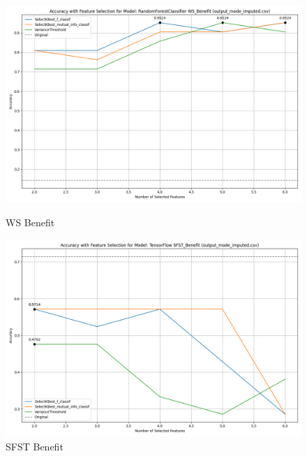 \begin{figure}[H]
    \centering
    \begin{minipage}[b]{0.45\textwidth}
        \includegraphics[width=\textwidth]{class_specific_section/images_class_ensemble_reduction/feature_selection_accuracy_plot_output_mode_imputedcsv_RandomForestClassifier_WS_Benefit.png}
        \caption{WS Benefit}
        \label{fig_class_spec:ws_ben_featred_graph}
    \end{minipage}
    \hfill
    \begin{minipage}[b]{0.45\textwidth}
        \includegraphics[width=\textwidth]{class_specific_section/images_class_ensemble_reduction/feature_selection_accuracy_plot_output_mode_imputedcsv_TensorFlow_SFST_Benefit.png}
        \caption{SFST Benefit}
        \label{fig_class_spec:sfst_ben_featred_graph}
    \end{minipage}
\end{figure}
